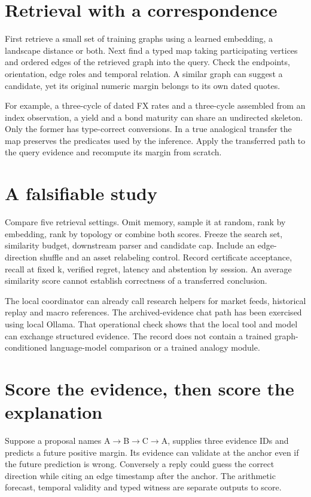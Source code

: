 \documentclass[11pt,oneside,openany]{book}
\begin{document}
\section*{Retrieval with a correspondence}
First retrieve a small set of training graphs using a learned embedding, a landscape distance or both. Next find a typed map taking participating vertices and ordered edges of the retrieved graph into the query. Check the endpoints, orientation, edge roles and temporal relation. A similar graph can suggest a candidate, yet its original numeric margin belongs to its own dated quotes.

For example, a three-cycle of dated FX rates and a three-cycle assembled from an index observation, a yield and a bond maturity can share an undirected skeleton. Only the former has type-correct conversions. In a true analogical transfer the map preserves the predicates used by the inference. Apply the transferred path to the query evidence and recompute its margin from scratch.

\section*{A falsifiable study}
Compare five retrieval settings. Omit memory, sample it at random, rank by embedding, rank by topology or combine both scores. Freeze the search set, similarity budget, downstream parser and candidate cap. Include an edge-direction shuffle and an asset relabeling control. Record certificate acceptance, recall at fixed k, verified regret, latency and abstention by session. An average similarity score cannot establish correctness of a transferred conclusion.

The local coordinator can already call research helpers for market feeds, historical replay and macro references. The archived-evidence chat path has been exercised using local Ollama. That operational check shows that the local tool and model can exchange structured evidence. The record does not contain a trained graph-conditioned language-model comparison or a trained analogy module.

\section*{Score the evidence, then score the explanation}
Suppose a proposal names A\ensuremath{\to}B\ensuremath{\to}C\ensuremath{\to}A, supplies three evidence IDs and predicts a future positive margin. Its evidence can validate at the anchor even if the future prediction is wrong. Conversely a reply could guess the correct direction while citing an edge timestamp after the anchor. The arithmetic forecast, temporal validity and typed witness are separate outputs to score.
\end{document}
